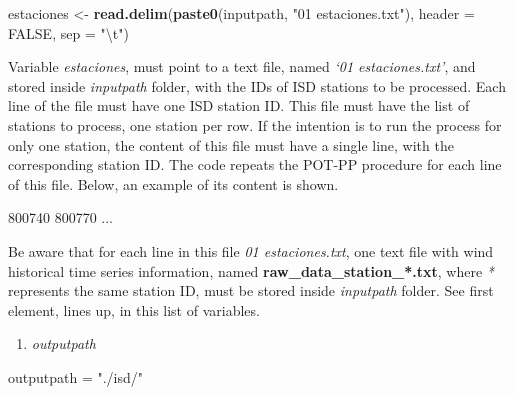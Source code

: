 \documentclass[12pt,twoside]{reedthesis}
\newenvironment{Shaded}{\begin{snugshade}}{\end{snugshade}}
\newcommand{\CharTok}[1]{\textcolor[rgb]{0.31,0.60,0.02}{#1}}
\newcommand{\DataTypeTok}[1]{\textcolor[rgb]{0.13,0.29,0.53}{#1}}
\newcommand{\ExtensionTok}[1]{#1}
\newcommand{\KeywordTok}[1]{\textcolor[rgb]{0.13,0.29,0.53}{\textbf{#1}}}
\newcommand{\NormalTok}[1]{#1}
\newcommand{\OtherTok}[1]{\textcolor[rgb]{0.56,0.35,0.01}{#1}}
\newcommand{\StringTok}[1]{\textcolor[rgb]{0.31,0.60,0.02}{#1}}
\providecommand{\tightlist}{%
  \setlength{\itemsep}{0pt}\setlength{\parskip}{0pt}}
\begin{document}
\vspace{0.4cm}
\begin{Shaded}
\begin{Highlighting}[]
\NormalTok{      estaciones <-}\StringTok{ }\KeywordTok{read.delim}\NormalTok{(}\KeywordTok{paste0}\NormalTok{(inputpath, }\StringTok{"01 estaciones.txt"}\NormalTok{), }
        \DataTypeTok{header =} \OtherTok{FALSE}\NormalTok{, }\DataTypeTok{sep =} \StringTok{"}\CharTok{\textbackslash{}t}\StringTok{"}\NormalTok{)}
\end{Highlighting}
\end{Shaded}
\normalsize

Variable \emph{estaciones}, must point to a text file, named \emph{`01 estaciones.txt'}, and stored inside \emph{inputpath} folder, with the IDs of ISD stations to be processed. Each line of the file must have one ISD station ID. This file must have the list of stations to process, one station per row. If the intention is to run the process for only one station, the content of this file must have a single line, with the corresponding station ID. The code repeats the POT-PP procedure for each line of this file. Below, an example of its content is shown.

\scriptsize

\vspace{0.4cm}
\begin{Shaded}
\begin{Highlighting}[]
      \ExtensionTok{800740}
      \ExtensionTok{800770}
      \ExtensionTok{...}
\end{Highlighting}
\end{Shaded}
\normalsize

Be aware that for each line in this file \emph{01 estaciones.txt}, one text file with wind historical time series information, named \textbf{raw\_data\_station\_*.txt}, where \emph{*} represents the same station ID, must be stored inside \emph{inputpath} folder. See first element, lines up, in this list of variables.
\begin{enumerate}
\def\labelenumi{\arabic{enumi}.}
\setcounter{enumi}{2}
\tightlist
\item
  \emph{outputpath}
\end{enumerate}
\scriptsize

\vspace{0.4cm}
\begin{Shaded}
\begin{Highlighting}[]
\NormalTok{      outputpath =}\StringTok{ "./isd/"}
\end{Highlighting}
\end{Shaded}
\normalsize
\end{document}
